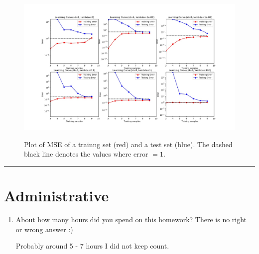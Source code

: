 \documentclass{article}
\begin{document}
\begin{aprob}
    \begin{figure}
        \centering
        \includegraphics[width=\textwidth]{../../../hw1-code/homeworks/poly_regression/fig3.jpg} \label{fig:mse}
        \caption{Plot of MSE of a trainng set (red) and a test set (blue). The dashed black line denotes the values where error $=1$.}
    \end{figure}

\end{aprob}

\rule{\textwidth}{0.25pt}

\newpage
\section*{Administrative}
\begin{aprob}
\begin{enumerate}
    \item {} About how many hours did you spend on this homework? There is no right or wrong answer :)

    Probably around 5 - 7 hours I did not keep count.
\end{enumerate}

\end{aprob}
\end{document}
